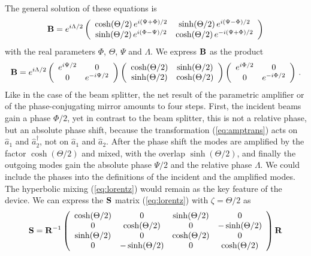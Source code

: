 \documentclass[12pt,amsmath,amssymb]{article}
\def\underline#1{{\bf #1}}
\numberwithin{equation}{section}
\begin{document}
The general solution of these equations is
\begin{equation}
\underline{B} = e^{i\Lambda/2}\left(
    \begin{array}{cc}
      \cosh(\Theta/2)\,e^{i(\Psi+\Phi)/2} &
      \sinh(\Theta/2)\,e^{i(\Psi-\Phi)/2}  \\
      \sinh(\Theta/2)\,e^{i(\Phi-\Psi)/2}  &
      \cosh(\Theta/2)\,e^{-i(\Psi+\Phi)/2}
    \end{array}
\right)
\end{equation}
with the real parameters $\Phi$, $\Theta$, $\Psi$ and $\Lambda$.
We express $\underline{B}$ as the product
\begin{equation}
\label{eq:u11} \underline{B} = e^{i\Lambda/2} \left(
    \begin{array}{cc}
      e^{i\Psi/2} & 0 \\
      0 & e^{-i\Psi/2}
    \end{array}\right) \left(
    \begin{array}{cc}
      \cosh(\Theta/2) & \sinh(\Theta/2) \\
      \sinh(\Theta/2) & \cosh(\Theta/2)
    \end{array}
\right)\left(
    \begin{array}{cc}
      e^{i\Phi/2} & 0 \\
      0 & e^{-i\Phi/2}
    \end{array}\right)\,.
\end{equation}
Like in the case of the beam splitter, the net result of the
parametric amplifier or of the phase-conjugating mirror amounts
to four steps. First, the incident beams gain a phase $\Phi/2$,
yet in contrast to the beam splitter, this is not a relative
phase, but an absolute phase shift, because the transformation
(\ref{eq:amptrans}) acts on $\hat{a}_1$ and $\hat{a}_2^\dagger$,
not on $\hat{a}_1$ and $\hat{a}_2$. After the phase shift the
modes are amplified by the factor $\cosh(\Theta/2)$ and mixed,
with the overlap $\sinh(\Theta/2)$, and finally the outgoing modes
gain the absolute phase $\Psi/2$ and the relative phase
$\Lambda$. We could include the phases into the definitions of
the incident and the amplified modes. The hyperbolic mixing
(\ref{eq:lorentz}) would remain as the key feature of the device.
We can express the $\underline{S}$ matrix (\ref{eq:lorentz}) with
$\zeta=\Theta/2$ as
\begin{equation}
\label{eq:factors}
\underline{S} = \underline{R}^{-1}
    \left(
    \begin{array}{cccc}
      \cosh(\Theta/2)&0&\sinh(\Theta/2)&0\\
      0&\cosh(\Theta/2)&0&-\sinh(\Theta/2)\\
      \sinh(\Theta/2)&0&\cosh(\Theta/2)&0\\
      0&-\sinh(\Theta/2)&0&\cosh(\Theta/2)
    \end{array}
\right) \underline{R}
\end{equation}
\end{document}

